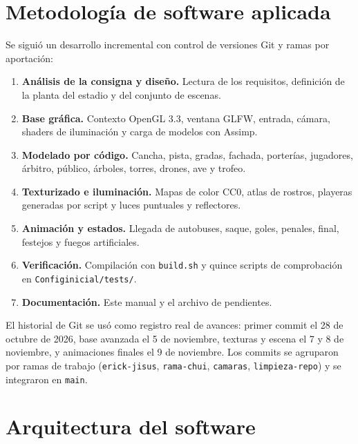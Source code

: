 \documentclass[12pt,letterpaper]{article}
\begin{document}
\section{Metodología de software aplicada}
Se siguió un desarrollo incremental con control de versiones Git y ramas por aportación:
\begin{enumerate}
  \item \textbf{Análisis de la consigna y diseño.} Lectura de los requisitos, definición de la
        planta del estadio y del conjunto de escenas.
  \item \textbf{Base gráfica.} Contexto OpenGL 3.3, ventana GLFW, entrada, cámara, shaders de
        iluminación y carga de modelos con Assimp.
  \item \textbf{Modelado por código.} Cancha, pista, gradas, fachada, porterías, jugadores, árbitro,
        público, árboles, torres, drones, ave y trofeo.
  \item \textbf{Texturizado e iluminación.} Mapas de color CC0, atlas de rostros, playeras generadas
        por script y luces puntuales y reflectores.
  \item \textbf{Animación y estados.} Llegada de autobuses, saque, goles, penales, final, festejos y
        fuegos artificiales.
  \item \textbf{Verificación.} Compilación con \texttt{build.sh} y quince scripts de comprobación en
        \texttt{Configinicial/tests/}.
  \item \textbf{Documentación.} Este manual y el archivo de pendientes.
\end{enumerate}
El historial de Git se usó como registro real de avances: primer commit el 28 de octubre de 2026,
base avanzada el 5 de noviembre, texturas y escena el 7 y 8 de noviembre, y animaciones finales el
9 de noviembre. Los commits se agruparon por ramas de trabajo (\texttt{erick-jisus},
\texttt{rama-chui}, \texttt{camaras}, \texttt{limpieza-repo}) y se integraron en \texttt{main}.

\section{Arquitectura del software}
\end{document}
